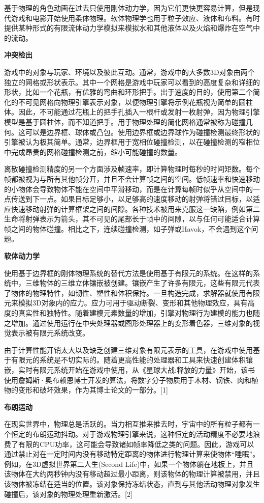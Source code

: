 基于物理的角色动画在过去只使用刚体动力学，因为它们更快更容易计算，但是现代游戏和电影开始使用柔体物理。软体物理学也用于粒子效应、液体和布料。有时提供某种形式的有限流体动力学模拟来模拟水和其他液体以及火焰和爆炸在空气中的流动。

\textbf{冲突检出}

游戏中的对象与玩家、环境以及彼此互动。通常，游戏中的大多数3D对象由两个独立的网格或形状表示。其中一个网格是游戏中玩家可以看到的高度复杂和详细的形状，比如一个花瓶，有优雅的弯曲和环形把手。出于速度的目的，使用第二个简化的不可见网格向物理引擎表示对象，以便物理引擎将示例花瓶视为简单的圆柱体。因此，不可能通过花瓶上的把手孔插入一根杆或发射一枚射弹，因为物理引擎模型是基于圆柱体，而不知道把手。用于物理处理的简化网格通常被称为碰撞几何。这可以是边界框、球体或凸包。使用边界框或边界球作为碰撞检测最终形状的引擎被认为极其简单。通常，边界框用于宽相位碰撞检测，以在碰撞检测的窄相位中完成昂贵的网格碰撞检测之前，缩小可能碰撞的数量。

离散碰撞检测精度的另一个方面涉及帧速率，即计算物理时每秒的时间矩数。每个帧都被视为与所有其他帧分开，并且不会计算帧之间的空间。低帧速率和快速移动的小物体会导致物体不能在空间中平滑移动，而是在计算每帧时似乎从空间中的一点传送到下一点。如果目标足够小，以足够高的速度移动的射弹将错过目标，以适应快速移动射弹的计算框架之间的间隙。各种技术被用来克服这一缺陷，例如第二生命将射弹表示为箭头，其不可见的尾部长于帧中的间隙，以与任何可能适合计算帧之间的物体碰撞。相比之下，连续碰撞检测，如子弹或Havok，不会遇到这个问题。

\textbf{软体动力学}

使用基于边界框的刚体物理系统的替代方法是使用基于有限元的系统。在这样的系统中，三维物体的三维立体镶嵌被创建。镶嵌产生了许多有限元，这些有限元代表了物体的物理特性，如韧性、塑性和体积保持。一旦构造完成，求解器就使用有限元来模拟3D对象内的应力。应力可用于驱动断裂、变形和其他物理效应，具有高度的真实性和独特性。随着建模元素数量的增加，引擎对物理行为建模的能力也随之增加。通过使用运行在中央处理器或图形处理器上的变形着色器，三维对象的视觉表示被有限元系统改变。

由于计算性能开销太大以及缺乏创建三维对象有限元表示的工具，在游戏中使用基于有限元的系统是不切实际的。随着更高性能的处理器和工具来快速创建体积镶嵌，实时有限元系统开始在游戏中使用，从《星球大战:释放的力量》开始，该书使用詹姆斯·奥布赖恩博士开发的算法，将数字分子物质用于木材、钢铁、肉和植物的变形和破坏效果，作为其博士论文的一部分。[1]

\textbf{布朗运动}

在现实世界中，物理总是活跃的。当力相互推来推去时，宇宙中的所有粒子都有一个恒定的布朗运动抖动。对于游戏物理引擎来说，这种恒定的活动精度不必要地浪费了有限的CPU功率，这可能会导致诸如帧率降低之类的问题。因此，游戏可以通过禁止对在一定时间内没有移动特定距离的物体进行物理计算来使物体“睡眠”。例如，在3D虚拟世界第二人生(Second Life)中，如果一个物体躺在地板上，并且该物体在大约两秒钟内没有移动超过最小距离，则该物体的物理计算被禁用，并且该物体被冻结在适当的位置。该对象保持冻结状态，直到与其他活动物理对象发生碰撞后，该对象的物理处理重新激活。[2]

